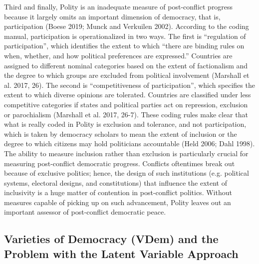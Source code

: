 \documentclass [11pt]{article}
\begin{document}
Third and finally, Polity is an inadequate measure of post-conflict progress because it largely omits an important dimension of democracy, that is, participation (Boese 2019; Munck and Verkuilen 2002). According to the coding manual, participation is operationalized in two ways. The first is ``regulation of participation'', which identifies the extent to which ``there are binding rules on when, whether, and how political preferences are expressed.'' Countries are assigned to different nominal categories based on the extent of factionalism and the degree to which groups are excluded from political involvement (Marshall et al. 2017, 26). The second is ``competitiveness of participation'', which specifies the extent to which diverse opinions are tolerated. Countries are classified under less competitive categories if states and political parties act on repression, exclusion or parochialism (Marshall et al. 2017, 26-7). These coding rules make clear that what is really coded in Polity is exclusion and tolerance, and not participation, which is taken by democracy scholars to mean the extent of inclusion or the degree to which citizens may hold politicians accountable (Held 2006; Dahl 1998). The ability to measure inclusion rather than exclusion is particularly crucial for measuring post-conflict democratic progress. Conflicts oftentimes break out because of exclusive politics; hence, the design of such institutions (e.g. political systems, electoral designs, and constitutions) that influence the extent of inclusivity is a huge matter of contention in post-conflict politics. Without measures capable of picking up on such advancement, Polity leaves out an important assessor of post-conflict democratic peace.

\subsection*{Varieties of Democracy (VDem) and the Problem with the Latent Variable Approach}
\end{document}
